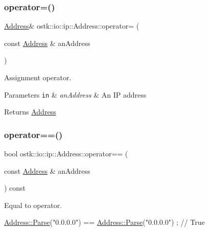 \subsubsection{\texorpdfstring{operator=()}{operator=()}}
{\footnotesize\ttfamily \hyperlink{classostk_1_1io_1_1ip_1_1_address}{Address}\& ostk\+::io\+::ip\+::\+Address\+::operator= (\begin{DoxyParamCaption}\item[{const \hyperlink{classostk_1_1io_1_1ip_1_1_address}{Address} \&}]{an\+Address }\end{DoxyParamCaption})}



Assignment operator. 


\begin{DoxyParams}[1]{Parameters}
\mbox{\tt in}  & {\em an\+Address} & An IP address \\
\hline
\end{DoxyParams}
\begin{DoxyReturn}{Returns}
\hyperlink{classostk_1_1io_1_1ip_1_1_address}{Address} 
\end{DoxyReturn}
\mbox{\label{classostk_1_1io_1_1ip_1_1_address_ad5133a34558d6e70356d635429e2529b}} 
\subsubsection{\texorpdfstring{operator==()}{operator==()}}
{\footnotesize\ttfamily bool ostk\+::io\+::ip\+::\+Address\+::operator== (\begin{DoxyParamCaption}\item[{const \hyperlink{classostk_1_1io_1_1ip_1_1_address}{Address} \&}]{an\+Address }\end{DoxyParamCaption}) const}



Equal to operator. 


\begin{DoxyCode}
\hyperlink{classostk_1_1io_1_1ip_1_1_address_a3d60e44d816e30f17db36f9bb7ac6307}{Address::Parse}(\textcolor{stringliteral}{"0.0.0.0"}) == \hyperlink{classostk_1_1io_1_1ip_1_1_address_a3d60e44d816e30f17db36f9bb7ac6307}{Address::Parse}(\textcolor{stringliteral}{"0.0.0.0"}) ; \textcolor{comment}{// True}
\end{DoxyCode}



